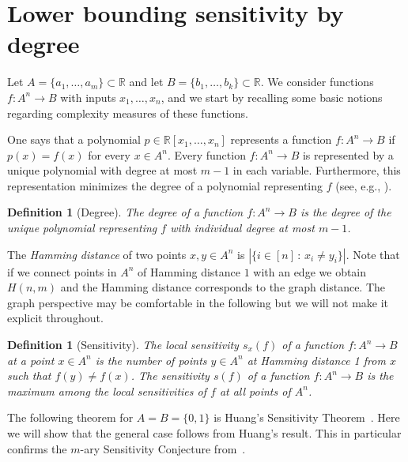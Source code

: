 \documentclass[a4paper,10pt]{amsart}
\newtheorem{defi}[thm]{Definition}
\providecommand{\RR}{\mathbb{R}}
\begin{document}
\section{Lower bounding sensitivity by degree}


Let $A = \{ a_1, \dots, a_m \} \subset \RR$ and let $B = \{ b_1, \dots, b_k \} \subset \RR$. We consider functions $f\colon A^n \to B$ with inputs $x_1, \dots, x_n$, and we start by recalling some basic notions regarding complexity measures of these functions.

One says that a polynomial $p \in \mathbb R[x_1,\ldots,x_n]$ represents a function $f\colon A^n \to B$ if $p(x) = f(x)$ for every $x \in A^n$. Every function $f\colon A^n \to B$ is represented by a unique polynomial with degree at most $m - 1$ in each variable. Furthermore, this representation minimizes the degree of a polynomial representing $f$ (see, e.g., \cite[Proposition 2.2]{AGMK24}).


\begin{defi}[Degree]
The \emph{degree} of a function $f\colon A^n \to B$ is the degree of the unique polynomial representing $f$ with individual degree at most $m - 1$.
\end{defi}



The \emph{Hamming distance} of two points $x, y\in A^n$ is $|\{i\in[n]\, \colon\,  x_i\neq y_i\}|$. Note  that if we connect points in $A^n$ of Hamming distance $1$  with an edge we obtain $H(n,m)$ and the Hamming distance corresponds to the graph distance. The graph perspective may be comfortable in the following but we will not make it explicit throughout. 

\begin{defi}[Sensitivity]
The \emph{local sensitivity} $s_x(f)$ of a function $f\colon A^n\to B$ at a point $x\in A^n$ is the number of points $y\in A^n$ at Hamming distance 1 from $x$ such that $f(y)\neq f(x)$. 
The \emph{sensitivity} $s(f)$ of a function $f\colon A^n \to B$ is the maximum among the local sensitivities of $f$ at all points of $A^n$.
\end{defi}


The following theorem for $A=B=\{0,1\}$ is Huang's Sensitivity Theorem~\cite{H19}. Here we will show that the general case follows from Huang's result. This in particular confirms the $m$-ary Sensitivity Conjecture from~\cite{AGMK24}. 

\sensitivity*
\end{document}
